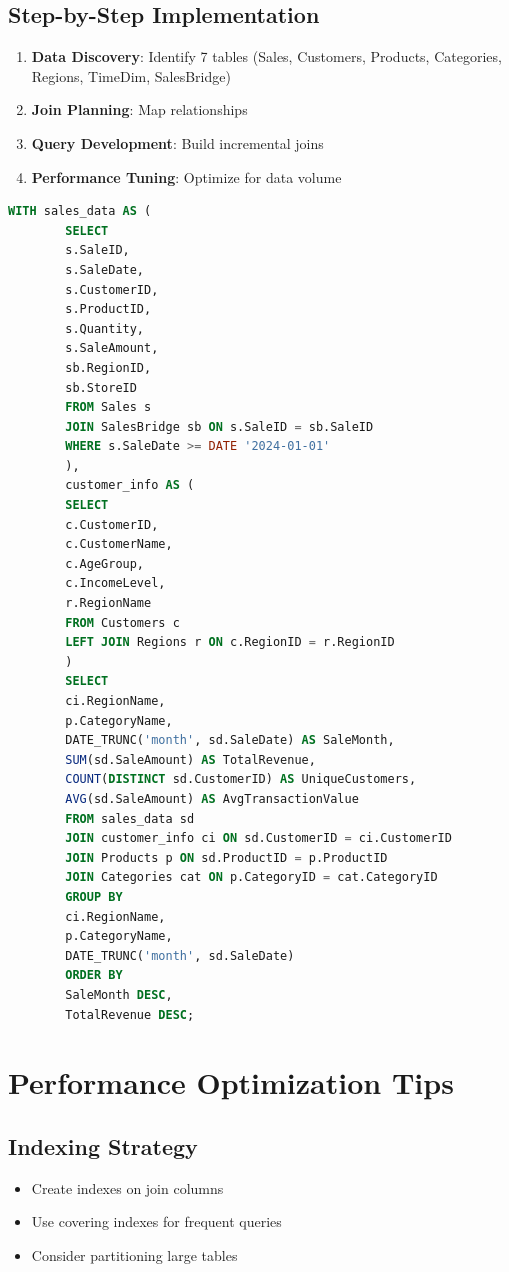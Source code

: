 \documentclass{article}
\begin{document}
	\subsection{Step-by-Step Implementation}
	
	\begin{enumerate}
		\item \textbf{Data Discovery}: Identify 7 tables (Sales, Customers, Products, Categories, Regions, TimeDim, SalesBridge)
		\item \textbf{Join Planning}: Map relationships
		\item \textbf{Query Development}: Build incremental joins
		\item \textbf{Performance Tuning}: Optimize for data volume
	\end{enumerate}
	
	\begin{lstlisting}[language=SQL, caption=Complex Sales Analysis Query]
		WITH sales_data AS (
		SELECT 
		s.SaleID,
		s.SaleDate,
		s.CustomerID,
		s.ProductID,
		s.Quantity,
		s.SaleAmount,
		sb.RegionID,
		sb.StoreID
		FROM Sales s
		JOIN SalesBridge sb ON s.SaleID = sb.SaleID
		WHERE s.SaleDate >= DATE '2024-01-01'
		),
		customer_info AS (
		SELECT 
		c.CustomerID,
		c.CustomerName,
		c.AgeGroup,
		c.IncomeLevel,
		r.RegionName
		FROM Customers c
		LEFT JOIN Regions r ON c.RegionID = r.RegionID
		)
		SELECT 
		ci.RegionName,
		p.CategoryName,
		DATE_TRUNC('month', sd.SaleDate) AS SaleMonth,
		SUM(sd.SaleAmount) AS TotalRevenue,
		COUNT(DISTINCT sd.CustomerID) AS UniqueCustomers,
		AVG(sd.SaleAmount) AS AvgTransactionValue
		FROM sales_data sd
		JOIN customer_info ci ON sd.CustomerID = ci.CustomerID
		JOIN Products p ON sd.ProductID = p.ProductID
		JOIN Categories cat ON p.CategoryID = cat.CategoryID
		GROUP BY 
		ci.RegionName,
		p.CategoryName,
		DATE_TRUNC('month', sd.SaleDate)
		ORDER BY 
		SaleMonth DESC,
		TotalRevenue DESC;
	\end{lstlisting}
	
	\section{Performance Optimization Tips}
	
	\subsection{Indexing Strategy}
	\begin{itemize}
		\item Create indexes on join columns
		\item Use covering indexes for frequent queries
		\item Consider partitioning large tables
	\end{itemize}
	
\end{document}

